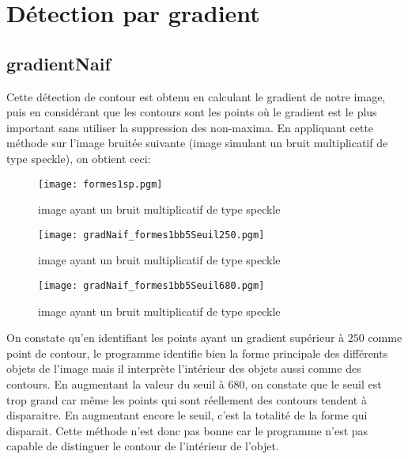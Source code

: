 \documentclass[12pt]{article}
\numberwithin{equation}{section}
\begin{document}
\section{Détection par gradient}

\subsection{gradientNaif}

Cette détection de contour est obtenu en calculant le gradient de notre image, puis en considérant que les contours sont les points où le gradient est le plus important sans utiliser la suppression des non-maxima. En appliquant cette méthode sur l'image bruitée suivante (image simulant un bruit multiplicatif de type speckle), on obtient ceci:

	\begin{figure}[!ht]
        \begin{center}
           \texttt{[image: formes1sp.pgm]} 
           \caption{image ayant un bruit multiplicatif de type speckle}
        \end{center}
    \end{figure}

	\begin{figure}[!ht]
        \begin{center}
           \texttt{[image: gradNaif\_formes1bb5Seuil250.pgm]} 
           \caption{image ayant un bruit multiplicatif de type speckle}
        \end{center}
    \end{figure}

	\begin{figure}[!ht]
        \begin{center}
           \texttt{[image: gradNaif\_formes1bb5Seuil680.pgm]} 
           \caption{image ayant un bruit multiplicatif de type speckle}
        \end{center}
    \end{figure}

On constate qu'en identifiant les points ayant un gradient supérieur à $250$ comme point de contour, le programme identifie bien la forme principale des différents objets de l'image mais il interprète l'intérieur des objets aussi comme des contours. En augmentant la valeur du seuil à 680, on constate que le seuil est trop grand car même les points qui sont réellement des contours tendent à disparaitre. En augmentant encore le seuil, c'est la totalité de la forme qui disparait. Cette méthode n'est donc pas bonne car le programme n'est pas capable de distinguer le contour de l'intérieur de l'objet.
\end{document}
